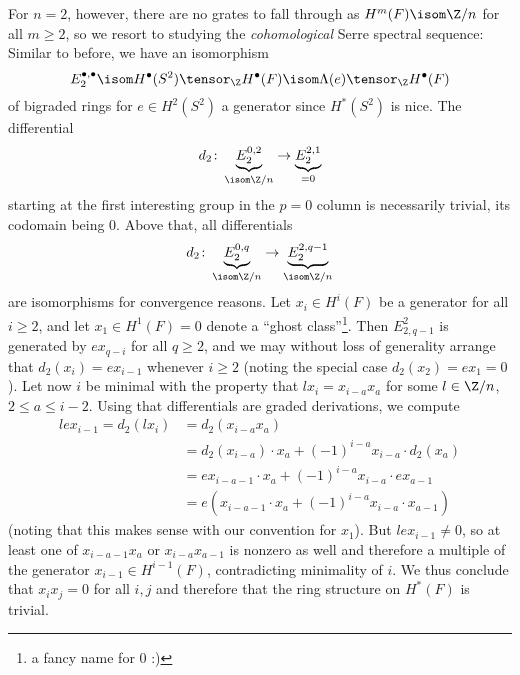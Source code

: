 \begin{solution}
	For $n = 2$, however, there are no grates to fall through as $H^m(F) \isom \Zn{n}$ for all $m \geq 2$, so we resort to studying the \emph{cohomological} Serre spectral sequence:
	Similar to before, we have an isomorphism
	\begin{equation*}
		E_2^{\bullet, \bullet} \isom H^\bullet(S^2) \tensor_{\Z} H^\bullet(F) \isom \Lambda(e) \tensor_{\Z} H^\bullet(F)
	\end{equation*}
	of bigraded rings for $e \in H^2(S^2)$ a generator since $H^*(S^2)$ is nice.
	The differential
	\begin{equation*}
		d_2\colon \underbrace{E_2^{0, 2}}_{\isom \Zn{n}} \to \underbrace{E_2^{2, 1}}_{= 0}
	\end{equation*}
	starting at the first interesting group in the $p = 0$ column is necessarily trivial, its codomain being 0.
	Above that, all differentials
	\begin{equation*}
		d_2\colon \underbrace{E_2^{0, q}}_{\isom \Zn{n}} \to \underbrace{E_2^{2, q - 1}}_{\isom \Zn{n}}
	\end{equation*}
	are isomorphisms for convergence reasons.
	Let $x_i \in H^i(F)$ be a generator for all $i \geq 2$, and let $x_1 \in H^1(F) = 0$ denote a \enquote{ghost class}\footnote{a fancy name for 0 :)}.
	Then $E^2_{2, q - 1}$ is generated by $e x_{q - i}$ for all $q \geq 2$, and we may without loss of generality arrange that $d_2(x_i) = e x_{i - 1}$ whenever $i \geq 2$ (noting the special case $d_2(x_2) = e x_1 = 0$).
	Let now $i$ be minimal with the property that $l x_i = x_{i - a} x_a$ for some $l \in \Zn{n}$, $2 \leq a \leq i - 2$.
	Using that differentials are graded derivations, we compute
	\begin{align*}
		l e x_{i - 1} = d_2(l x_i) &= d_2(x_{i - a} x_a) \\
								   &= d_2(x_{i - a}) \cdot x_a + (-1)^{i - a} x_{i - a} \cdot d_2(x_a) \\
								   &= e x_{i - a - 1} \cdot x_a + (-1)^{i - a} x_{i - a} \cdot e x_{a - 1} \\
								   &= e (x_{i - a - 1} \cdot x_a + (-1)^{i - a} x_{i - a} \cdot x_{a - 1})
	\end{align*}
	(noting that this makes sense with our convention for $x_1$).
	But $l e x_{i - 1} \neq 0$, so at least one of $x_{i - a - 1} x_a$ or $x_{i - a} x_{a - 1}$ is nonzero as well and therefore a multiple of the generator $x_{i - 1} \in H^{i - 1}(F)$, contradicting minimality of $i$.
	We thus conclude that $x_i x_j = 0$ for all $i, j$ and therefore that the ring structure on $H^*(F)$ is trivial.
\end{solution}


